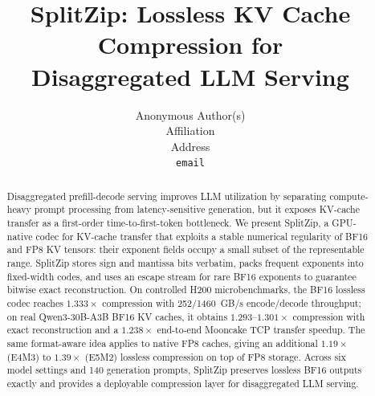 \documentclass{article}
\title{SplitZip: Lossless KV Cache Compression for\\Disaggregated LLM Serving}
\author{%
  Anonymous Author(s) \\
  Affiliation \\
  Address \\
  \texttt{email} \\
}
\newcommand{\splitzip}{SplitZip\xspace}
\begin{document}
\maketitle

\begin{abstract}
Disaggregated prefill-decode serving improves LLM utilization by separating compute-heavy prompt processing from latency-sensitive generation, but it exposes KV-cache transfer as a first-order time-to-first-token bottleneck. We present \splitzip, a GPU-native codec for KV-cache transfer that exploits a stable numerical regularity of BF16 and FP8 KV tensors: their exponent fields occupy a small subset of the representable range. \splitzip stores sign and mantissa bits verbatim, packs frequent exponents into fixed-width codes, and uses an escape stream for rare BF16 exponents to guarantee bitwise exact reconstruction. On controlled H200 microbenchmarks, the BF16 lossless codec reaches $1.333\times$ compression with 252/1460~GB/s encode/decode throughput; on real Qwen3-30B-A3B BF16 KV caches, it obtains $1.293$--$1.301\times$ compression with exact reconstruction and a $1.238\times$ end-to-end Mooncake TCP transfer speedup. The same format-aware idea applies to native FP8 caches, giving an additional $1.19\times$ (E4M3) to $1.39\times$ (E5M2) lossless compression on top of FP8 storage. Across six model settings and 140 generation prompts, \splitzip preserves lossless BF16 outputs exactly and provides a deployable compression layer for disaggregated LLM serving.
\end{abstract}







{\small


}

\newpage

\end{document}
